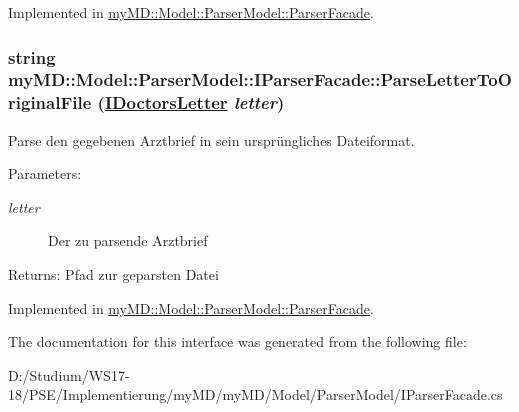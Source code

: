 Implemented in \hyperlink{classmy_m_d_1_1_model_1_1_parser_model_1_1_parser_facade_6ffe5b6c5af78ec3e9cdb29a04560a9f}{my\-MD::Model::Parser\-Model::Parser\-Facade}.\hypertarget{interfacemy_m_d_1_1_model_1_1_parser_model_1_1_i_parser_facade_b00612cc050463e46a4078ec61ef5bae}{
\subsubsection[ParseLetterToOriginalFile]{\setlength{\rightskip}{0pt plus 5cm}string my\-MD::Model::Parser\-Model::IParser\-Facade::Parse\-Letter\-To\-Original\-File (\hyperlink{interfacemy_m_d_1_1_model_interface_1_1_data_model_interface_1_1_i_doctors_letter}{IDoctors\-Letter} {\em letter})}}
\label{d6/d07/interfacemy_m_d_1_1_model_1_1_parser_model_1_1_i_parser_facade_b00612cc050463e46a4078ec61ef5bae}


Parse den gegebenen Arztbrief in sein urspr\"{u}ngliches Dateiformat. 

\begin{Desc}
\item[Parameters:]
\begin{description}
\item[{\em letter}]Der zu parsende Arztbrief\end{description}
\end{Desc}
\begin{Desc}
\item[Returns:]Pfad zur geparsten Datei\end{Desc}


Implemented in \hyperlink{classmy_m_d_1_1_model_1_1_parser_model_1_1_parser_facade_b00612cc050463e46a4078ec61ef5bae}{my\-MD::Model::Parser\-Model::Parser\-Facade}.

The documentation for this interface was generated from the following file:\begin{CompactItemize}
\item 
D:/Studium/WS17-18/PSE/Implementierung/my\-MD/my\-MD/Model/Parser\-Model/IParser\-Facade.cs\end{CompactItemize}
